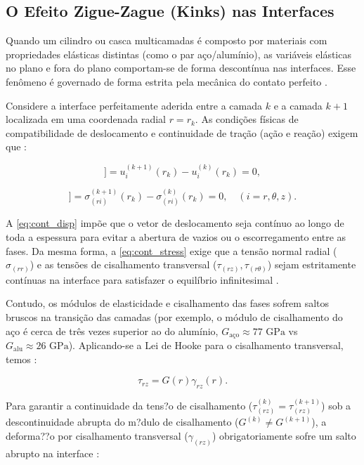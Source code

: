 \subsection{O Efeito Zigue-Zague (\textbf{Kinks}) nas Interfaces}

Quando um cilindro ou casca multicamadas é composto por materiais com propriedades elásticas distintas (como o par aço/alumínio), as variáveis elásticas no plano e fora do plano comportam-se de forma descontínua nas interfaces. Esse fenômeno é governado de forma estrita pela mecânica do contato perfeito \cite{RMJones2018}.

Considere a interface perfeitamente aderida entre a camada $k$ e a camada $k+1$ localizada em uma coordenada radial $r = r_k$. As condições físicas de compatibilidade de deslocamento e continuidade de tração (ação e reação) exigem que \cite{RMJones2018}:

\begin{equation}
    [[ u_i ]] = u_i^{(k+1)}(r_k) - u_i^{(k)}(r_k) = 0, 
\end{equation} \label{eq:cont_disp}

\begin{equation}
    [[ \sigma_{(ri)} ]] = \sigma_{(ri)}^{(k+1)}(r_k) - \sigma_{(ri)}^{(k)}(r_k) = 0, \quad (i = r, \theta, z) .
\end{equation} \label{eq:cont_stress}

A \eqref{eq:cont_disp} impõe que o vetor de deslocamento seja contínuo ao longo de toda a espessura para evitar a abertura de vazios ou o escorregamento entre as fases. Da mesma forma, a \eqref{eq:cont_stress} exige que a tensão normal radial ($\sigma_{(rr)}$) e as tensões de cisalhamento transversal ($\tau_{(rz)}, \tau_{(r\theta)}$) sejam estritamente contínuas na interface para satisfazer o equilíbrio infinitesimal \cite{RMJones2018}.

Contudo, os módulos de elasticidade e cisalhamento das fases sofrem saltos bruscos na transição das camadas (por exemplo, o módulo de cisalhamento do aço é cerca de três vezes superior ao do alumínio, $G_{\text{aço}} \approx 77 \text{ GPa}$ vs $G_{\text{alu}} \approx 26 \text{ GPa}$). Aplicando-se a Lei de Hooke para o cisalhamento transversal, temos \cite{RMJones2018}:

\begin{equation}
    \tau_{rz} = G(r) \gamma_{r z} (r). 
\end{equation} \label{eq:hooke_shear}

Para garantir a continuidade da tens?o de cisalhamento ($\tau_{(rz)}^{(k)} = \tau_{(rz)}^{(k+1)}$) sob a descontinuidade abrupta do m?dulo de cisalhamento ($G^{(k)} \neq G^{(k+1)}$), a deforma??o por cisalhamento transversal ($\gamma_{(rz)}$) obrigatoriamente sofre um salto abrupto na interface \cite{RMJones2018}:

